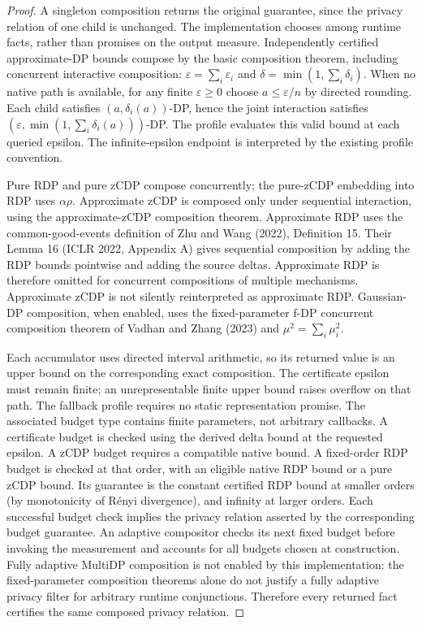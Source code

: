 \documentclass{article}
\begin{document}
\begin{proof}
A singleton composition returns the original guarantee, since the privacy
relation of one child is unchanged. The implementation chooses among runtime facts, rather than promises
on the output measure. Independently certified approximate-DP bounds compose
by the basic composition theorem, including concurrent interactive composition:
$\varepsilon = \sum_i\varepsilon_i$ and $\delta=\min(1,\sum_i\delta_i)$.
When no native path is available, for any finite $\varepsilon\geq0$ choose
$a\leq\varepsilon/n$ by directed rounding. Each child satisfies
$(a,\delta_i(a))$-DP, hence the joint interaction satisfies
$(\varepsilon,\min(1,\sum_i\delta_i(a)))$-DP. The profile evaluates this
valid bound at each queried epsilon. The infinite-epsilon endpoint is
interpreted by the existing profile convention.

Pure RDP and pure zCDP compose concurrently; the pure-zCDP embedding into
RDP uses $\alpha\rho$. Approximate zCDP is composed only under sequential
interaction, using the approximate-zCDP composition theorem. Approximate RDP
uses the common-good-events definition of Zhu and Wang (2022), Definition 15.
Their Lemma 16 (ICLR 2022, Appendix A) gives sequential composition by adding
the RDP bounds pointwise and adding the source deltas. Approximate RDP is
therefore omitted for concurrent compositions of multiple mechanisms.
Approximate zCDP is not silently reinterpreted as approximate RDP.
Gaussian-DP composition, when enabled, uses the fixed-parameter f-DP
concurrent composition theorem of Vadhan and Zhang (2023) and
$\mu^2=\sum_i\mu_i^2$.

Each accumulator uses directed interval arithmetic, so its returned value is
an upper bound on the corresponding exact composition. The certificate epsilon
must remain finite; an unrepresentable finite upper bound raises overflow on
that path. The fallback profile requires no static representation promise.
The associated budget type contains finite parameters, not arbitrary
callbacks. A certificate budget is checked using the derived delta bound at
the requested epsilon. A zCDP budget requires a compatible native bound.
A fixed-order RDP budget is checked at that order, with an eligible native
RDP bound or a pure zCDP bound. Its guarantee is the constant certified
RDP bound at smaller orders (by monotonicity of Rényi divergence), and
infinity at larger orders. Each successful budget check implies the
privacy relation asserted by the corresponding budget guarantee.
An adaptive compositor checks its next fixed budget before invoking the
measurement and accounts for all budgets chosen at construction.
Fully adaptive MultiDP composition is not enabled by this implementation:
the fixed-parameter composition theorems alone do not justify a fully
adaptive privacy filter for arbitrary runtime conjunctions.
Therefore every returned fact certifies the same composed privacy relation.
\end{proof}



\end{document}
